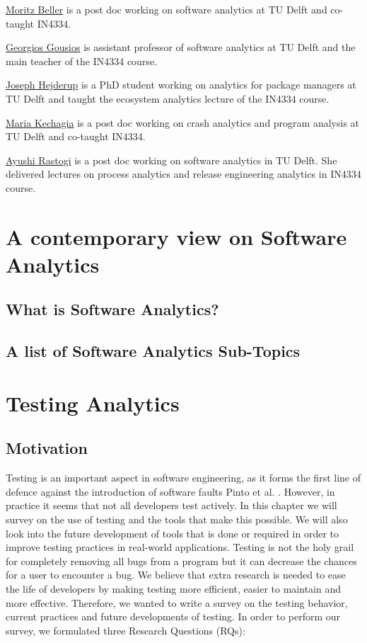 \documentclass[]{book}
\begin{document}
\href{http://inventitech.com}{Moritz Beller} is a post doc working on
software analytics at TU Delft and co-taught IN4334.

\href{http://gousios.org}{Georgios Gousios} is assistant professor of
software analytics at TU Delft and the main teacher of the IN4334
course.

\href{https://jhejderup.github.io/}{Joseph Hejderup} is a PhD student
working on analytics for package managers at TU Delft and taught the
ecosystem analytics lecture of the IN4334 course.

\href{https://mkechagia.github.io/}{Maria Kechagia} is a post doc
working on crash analytics and program analysis at TU Delft and
co-taught IN4334.

\href{https://ayushirastogi.github.io/}{Ayushi Rastogi} is a post doc
working on software analytics in TU Delft. She delivered lectures on
process analytics and release engineering analytics in IN4334 course.

\chapter{A contemporary view on Software
Analytics}\label{a-contemporary-view-on-software-analytics}

\section{What is Software Analytics?}\label{what-is-software-analytics}

\section{A list of Software Analytics
Sub-Topics}\label{a-list-of-software-analytics-sub-topics}

\chapter{Testing Analytics}\label{testing-analytics}

\section{Motivation}\label{motivation}

Testing is an important aspect in software engineering, as it forms the
first line of defence against the introduction of software faults Pinto
et al. \cite{pinto2012understanding}. However, in practice it seems that
not all developers test actively. In this chapter we will survey on the
use of testing and the tools that make this possible. We will also look
into the future development of tools that is done or required in order
to improve testing practices in real-world applications. Testing is not
the holy grail for completely removing all bugs from a program but it
can decrease the chances for a user to encounter a bug. We believe that
extra research is needed to ease the life of developers by making
testing more efficient, easier to maintain and more effective.
Therefore, we wanted to write a survey on the testing behavior, current
practices and future developments of testing. In order to perform our
survey, we formulated three Research Questions (RQs):
\end{document}
